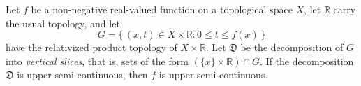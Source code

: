 Let $f$ be a non-negative real-valued function on a topological space $X$, let $\mathbb{R}$ carry the usual topology, and let
\[
G = \{\, (x, t) \in X \times \mathbb{R} : 0 \leq t \leq f(x) \,\}
\]
have the relativized product topology of $X \times \mathbb{R}$. Let $\mathfrak{D}$ be the decomposition of $G$ into \emph{vertical slices}, that is, sets of the form $(\{x\} \times \mathbb{R}) \cap G$. If the decomposition $\mathfrak{D}$ is upper semi-continuous, then $f$ is upper semi-continuous.
